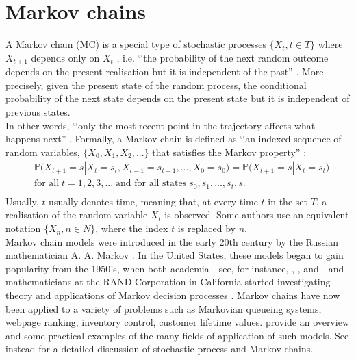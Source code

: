 \documentclass[\main/main.tex]{subfiles}
\begin{document}
\section{Markov chains} \label{markov_chain}
A Markov chain (MC) is a special type of stochastic processes  $  \{ X_t, t \in T\}$ where $X_{t+1}$ depends only on $X_{t}$ , i.e. \lq\lq the probability of the next random outcome depends on the present realisation but it is independent of the past'' \citep{Grinstead1997}. 
More precisely, given the present state of the random process, the conditional probability of the next state depends on the present state but it is independent of previous states.\\
In other words, \lq\lq only the most recent point in the trajectory affects what happens next'' \citep{Holmes2015}. Formally, a Markov chain is defined as \lq\lq an indexed sequence of random variables, $\{X_0, X_1, X_2, ...\}$ that satisfies the Markov property'' \citep{Sheskin2010}:
\begin{equation}
\begin{split}
     & \mathds{P} \big(X_{t+1} = s |X_t = s_t, X_{t-1} = s_{t-1}, . . . , X_0 = s_0\big) = 
     \mathds{P} \big(X_{t+1} = s |X_t = s_t\big)\\
    & \text{for all} \; t = 1, 2, 3, ... \; \text{and for all states} \; s_0, s_1, . . . , s_t, s.\\
\end{split}
\end{equation}
Usually, $t$ usually denotes time, meaning that, at every time $t$ in the set $T$, a realisation of the random variable $X_t$ is observed.
Some authors use an equivalent notation $\{X_n, n \in N\}$, where the index $t$ is replaced by $n$.\\


Markov chain models were introduced in the early 20th century by the Russian mathematician A. A. Markov \citep{Hayes2013}. In the United States, these models began to gain popularity from the 1950's, when both academia - see, for instance, \cite{Feller1950}, \cite{Howard1960}, and \cite{Kemeny1960} - and mathematicians at the RAND Corporation in California started investigating theory and applications of Markov decision processes \citep{Sheskin2010}. Markov chains have now been applied to a variety of problems such as Markovian queueing systems, webpage ranking, inventory control, customer lifetime values. \cite{Ching2006} provide an overview and some practical examples of the many fields of application of such models.
See instead \cite{Karlin1975} for a detailed discussion of stochastic process and Markov chains. 
\end{document}
